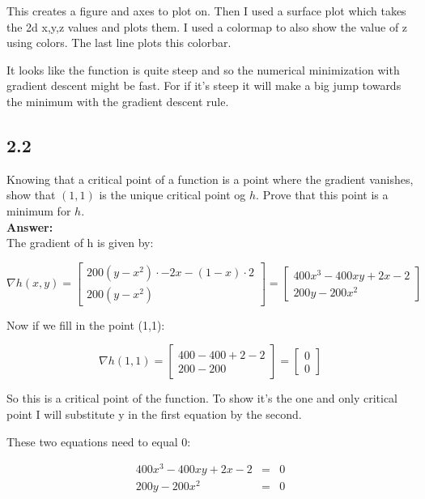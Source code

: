 \documentclass[a4paper]{article}
\begin{document}
This creates a figure and axes to plot on. Then I used a surface plot which takes the 2d x,y,z values and plots them. I used a colormap to also show the value of z using colors. The last line plots this colorbar.

It looks like the function is quite steep and so the numerical minimization with gradient descent might be fast. For if it's steep it will make a big jump towards the minimum with the gradient descent rule.

\subsection*{2.2}

Knowing that a critical point of a function is a point where the gradient vanishes, show that $(1,1)$ is the unique critical point og $h$. Prove that this point is a minimum for $h$.\\

\textbf{Answer:}\\

The gradient of h is given by:

\begin{equation}
\nabla h(x,y) = \begin{bmatrix}
200(y-x^2)\cdot -2x -(1-x)\cdot 2\\
200(y-x^2)
\end{bmatrix} = \begin{bmatrix}
400x^3-400xy+2x-2\\
200y-200x^2
\end{bmatrix}
\end{equation}

Now if we fill in the point (1,1):

\begin{equation}
\nabla h(1,1) = \begin{bmatrix}
400-400+2-2\\
200-200
\end{bmatrix} = \begin{bmatrix}
0\\
0
\end{bmatrix}
\end{equation}

So this is a critical point of the function. To show it's the one and only critical point I will substitute y in the first equation by the second.

These two equations need to equal 0:

\begin{eqnarray}
400x^3-400xy+2x-2 &=& 0\\
200y-200x^2 &=& 0
\end{eqnarray}
\end{document}
